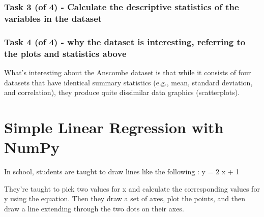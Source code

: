 \documentclass[11pt]{article}
\begin{document}
    \subsubsection{Task 3 (of 4) - Calculate the descriptive statistics of
the variables in the
dataset}\label{task-3-of-4---calculate-the-descriptive-statistics-of-the-variables-in-the-dataset}

    \subsubsection{Task 4 (of 4) - why the dataset is interesting, referring
to the plots and statistics
above}\label{task-4-of-4---why-the-dataset-is-interesting-referring-to-the-plots-and-statistics-above}

What's interesting about the Anscombe dataset is that while it consists
of four datasets that have identical summary statistics (e.g., mean,
standard deviation, and correlation), they produce quite dissimilar data
graphics (scatterplots).

    \section{Simple Linear Regression with
NumPy}\label{simple-linear-regression-with-numpy}

    In school, students are taught to draw lines like the following : y = 2
x + 1

They're taught to pick two values for x and calculate the corresponding
values for y using the equation. Then they draw a set of axes, plot the
points, and then draw a line extending through the two dots on their
axes.
\end{document}
